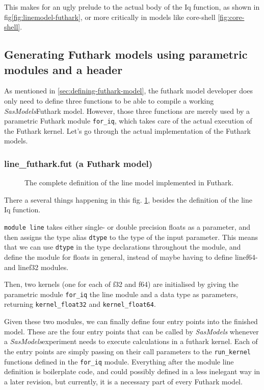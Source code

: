 \documentclass[11pt]{article}
\newcommand{\sasmodels}{\textit{SasModels}}
\begin{document}
This makes for an ugly prelude to the actual body of the Iq function, as shown
in fig\ref{fig:linemodel-futhark}, or more critically in models like 
core-shell \ref{fig:core-shell}.


\subsection{Generating Futhark models using parametric modules and a header}
\label{sec:generating-futhark}
As mentioned in \ref{sec:defining-futhark-model}, the futhark model developer
does only need to define three functions to be able to compile a working 
\sasmodels Futhark model.
However, those three functions are merely used by a parametric Futhark module 
\texttt{for\_iq}, which takes care of the actual execution of the 
Futhark kernel.
Let's go through the actual implementation of the Futhark models.

\subsubsection{line\_futhark.fut (a Futhark model)}
\label{sec:line-fut}
\begin{figure}
  \caption{The complete definition of the line model implemented in Futhark.}
  \label{fig:line-fut}
\end{figure}
There a several things happening in this fig. \ref{fig:line-fut}, besides the 
definition of the line Iq function.

\texttt{module line} takes either single- or double precision floats as a
parameter, and then assigns the type alias \texttt{dtype} to the type of the
input parameter. This means that we can use \texttt{dtype} in the type
declarations throughout the module, and define the module for floats in general,
instead of maybe having to define linef64- and linef32 modules.

Then, two kernels (one for each of f32 and f64) are initialised by giving
the parametric module \texttt{for\_iq} the line module and a data type 
as parameters, returning \texttt{kernel\_float32} and \texttt{kernel\_float64}.

Given these two modules, we can finally define four entry points into the
finished model. These are the four entry points that can be called by \sasmodels
whenever a \sasmodels experiment needs to execute calculations in a futhark
kernel.
Each of the entry points are simply passing on their call parameters to the 
\texttt{run\_kernel} functions defined in the \texttt{for\_iq} module.
Everything after the module line definition is boilerplate code, and could
possibly defined in a less inelegant way in a later revision, but currently, it 
is a necessary part of every Futhark model.
\end{document}
